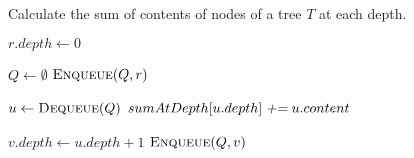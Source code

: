 
\begin{algorithm}[H]
  \caption{Calculate the sum of contents of nodes of a tree $T$ at each depth.}
  \label{alg:sum-at-depth}
  \begin{algorithmic}[1]
     
      \State $r.depth \gets 0$

      \hStatex
      \State $Q \gets \emptyset$
      \State $\Call{Enqueue}{Q, r}$

      \hStatex
	\State $u \gets \Call{Dequeue}{Q}$
	\State $sumAtDepth[u.depth] \textsl{\;+=\;} u.content$

	\hStatex
	  \State $v.depth \gets u.depth + 1$
	  \State $\Call{Enqueue}{Q, v}$
	\EndFor
      \EndWhile
    \EndProcedure
  \end{algorithmic}
\end{algorithm}
